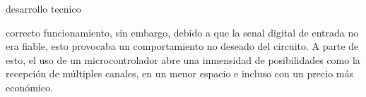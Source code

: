 desarrollo tecnico

correcto funcionamiento, sin embargo, debido a que la senal digital de entrada no era fiable, esto provocaba un comportamiento no deseado del circuito. 
A parte de esto, el uso de un microcontrolador abre una inmensidad de posibilidades como la recepci\'on de múltiples canales, en un menor espacio e incluso con un precio más económico.
